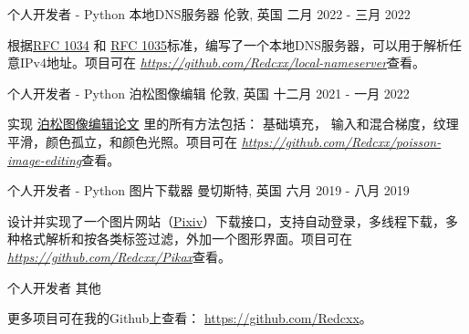 \begin{cventries}
  \cventry
    {个人开发者 - Python} %
    {本地DNS服务器} %
    {伦敦, 英国} %
    {二月 2022 - 三月 2022} %
    {
      \begin{cvitems} %
        \item {根据\href{https://datatracker.ietf.org/doc/html/rfc1034}{RFC 1034} 和 \href{https://datatracker.ietf.org/doc/html/rfc1035}{RFC 1035}标准，编写了一个本地DNS服务器，可以用于解析任意IPv4地址。项目可在 \href{https://github.com/Redcxx/local-nameserver}{\textit{https://github.com/Redcxx/local-nameserver}}查看。}
      \end{cvitems}
    }
    
  \cventry
    {个人开发者 - Python} %
    {泊松图像编辑} %
    {伦敦, 英国} %
    {十二月 2021 - 一月 2022} %
    {
      \begin{cvitems} %
        \item {实现 \href{https://www.cs.jhu.edu/~misha/Fall07/Papers/Perez03.pdf}{泊松图像编辑论文} 里的所有方法包括： 基础填充， 输入和混合梯度，纹理平滑，颜色孤立，和颜色光照。项目可在 \href{https://github.com/Redcxx/poisson-image-editing}{\textit{https://github.com/Redcxx/poisson-image-editing}}查看。}
      \end{cvitems}
    }

  \cventry
    {个人开发者 - Python} %
    {图片下载器} %
    {曼切斯特, 英国} %
    {六月 2019 - 八月 2019} %
    {
      \begin{cvitems} %
        \item {设计并实现了一个图片网站（\href{https://www.pixiv.net/}{Pixiv}）下载接口，支持自动登录，多线程下载，多种格式解析和按各类标签过滤，外加一个图形界面。项目可在 \href{https://github.com/Redcxx/Pikax}{\textit{https://github.com/Redcxx/Pikax}}查看。}
      \end{cvitems}
    }
    
  \cventry
    {个人开发者} %
    {其他} %
    {} %
    {} %
    {
      \begin{cvitems} %
        \item {更多项目可在我的Github上查看： \href{https://github.com/Redcxx}{https://github.com/Redcxx}。}
      \end{cvitems}
    }
  
    


\end{cventries}
